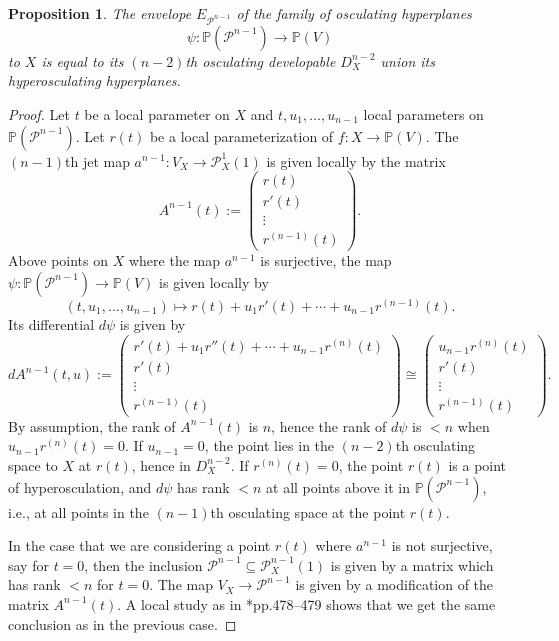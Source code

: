 \documentclass[reqno]{amsart}
\newtheorem{prop}[lemma]{Proposition}
\theoremstyle{definition}
\theoremstyle{remark}
\begin{document}
\begin{prop}
The envelope $E_{\mathcal P^{n-1}}$ of the family of osculating hyperplanes 
\[\psi\colon \mathbb P(\mathcal P^{n-1})\to \mathbb P(V)\]
to $X$ is equal to  its $(n-2)$th osculating developable $D^{n-2}_X$ union its hyperosculating hyperplanes.
\end{prop}

\begin{proof}
Let $t$ be a local parameter on $X$ and $t,u_1,\dots,u_{n-1}$ local parameters on $\mathbb P(\mathcal P^{n-1})$. Let $r(t)$ be a local parameterization of $f\colon X\to \mathbb P(V)$.
The $(n-1)$th jet map $a^{n-1}\colon V_X\to \mathcal P^1_X(1)$ is given locally by the matrix
\[A^{n-1}(t):=\left( \begin{array}{c}
r(t)\\
r'(t)\\
\vdots\\
r^{(n-1)}(t)
\end{array}\right).
\]
 Above points on $X$ where the map $a^{n-1}$ is surjective, the map $\psi\colon \mathbb P(\mathcal P^{n-1})\to \mathbb P(V)$ is
 given locally by \[(t,u_1,\ldots,u_{n-1})\mapsto r(t)+u_1r'(t)+\cdots +u_{n-1}r^{(n-1)}(t).\]
Its differential $d\psi$ is given by
\[dA^{n-1}(t,u):=\left( \begin{array}{c}
r'(t)+u_1r''(t)+\cdots +u_{n-1}r^{(n)}(t)\\
r'(t)\\
\vdots\\
r^{(n-1)}(t)
\end{array}\right)\cong
\left(\begin{array}{c}
u_{n-1}r^{(n)}(t)\\
r'(t)\\
\vdots\\
r^{(n-1)}(t)
\end{array}\right).
\]
By assumption, the rank of $A^{n-1}(t)$ is $n$, hence the 
rank of $d\psi$ is $<n$ when $u_{n-1}r^{(n)}(t)=0$.   If $u_{n-1}=0$, the point lies in the $(n-2)$th osculating space to $X$ at $r(t)$, hence in $D^{n-2}_X$. If $r^{(n)}(t)=0$, the point $r(t)$ is a point of hyperosculation, and $d\psi$ has rank $< n$ at all points above it in $\mathbb P(\mathcal P^{n-1})$, i.e., at all points in the $(n-1)$th osculating space at the point $r(t)$.

In the case that we are considering a point $r(t)$ where $a^{n-1}$ is not surjective, say for $t=0$, then the inclusion $\mathcal P^{n-1}\subseteq \mathcal P^{n-1}_X(1)$ is given by a matrix which has rank $< n$ for $t=0$. The map $V_X\to \mathcal P^{n-1}$ is given by a modification of the matrix $A^{n-1}(t)$. A local study as in \cite{numchar}*{pp.478--479} shows that we get the same conclusion as in the previous case.
\end{proof}
\medskip
\end{document}
